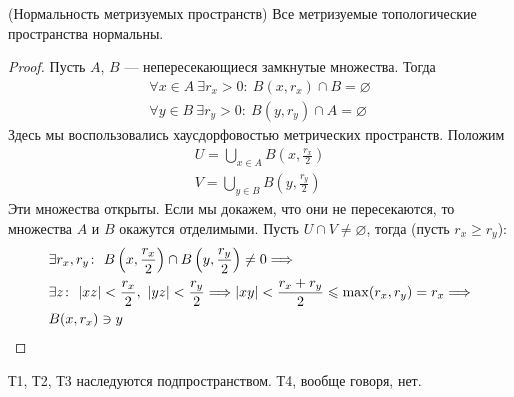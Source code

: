 \begin{theorem}(Нормальность метризуемых пространств)
	Все метризуемые топологические пространства нормальны.
\end{theorem}
\begin{proof}
	Пусть $A$, $B$ --- непересекающиеся замкнутые множества. Тогда
	\begin{align*}
		\forall x \in A~ \exists r_x > 0\colon~ B(x, r_x) \cap B = \varnothing \\
		\forall y \in B~ \exists r_y > 0\colon~ B(y, r_y) \cap A = \varnothing
	\end{align*}
	Здесь мы воспользовались хаусдорфовостью метрических пространств.
	Положим
	\begin{align*}
		U = \bigcup_{x \in A}{B\left(x, \frac{r_x}{2}\right)} \\
		V = \bigcup_{y \in B}{B\left(y, \frac{r_y}{2}\right)}
	\end{align*}
	Эти множества открыты. Если мы докажем, что они не пересекаются,
	то множества $A$ и $B$ окажутся отделимыми.
	Пусть $U \cap V \neq \varnothing$, тогда (пусть $r_x \geqslant r_y$):
\begin{align*}
	&\exists r_x, r_y\colon~ B\left(x, \frac{r_x}{2}\right)
		\cap B\left(y, \frac{r_y}{2}\right) \neq 0 \Longrightarrow \\
	&\exists z\colon~ |xz| < \frac{r_x}{2},~ |yz| < \frac{r_y}{2} \Longrightarrow
	|xy| < \frac{r_x + r_y}{2} \leqslant \max(r_x, r_y) = r_x
	\Longrightarrow \\ &B(x, r_x) \ni y
\end{align*}
\end{proof}

\begin{remark}
	Т1, Т2, Т3 наследуются подпространством. Т4, вообще говоря, нет.
\end{remark}
